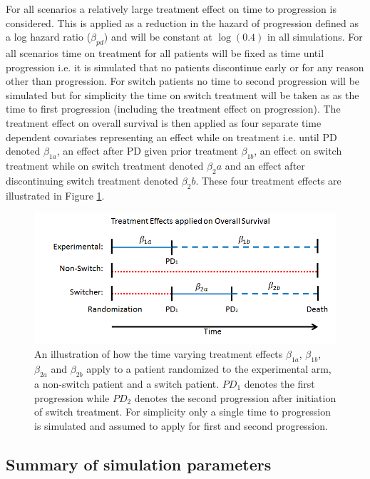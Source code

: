 For all scenarios a relatively large treatment effect on time to progression is considered. This is applied as a reduction in the hazard of progression defined as a log hazard ratio ($\beta_{pd}$) and will be constant at $\log(0.4)$ in all simulations. For all scenarios time on treatment for all patients will be fixed as time until progression i.e. it is simulated that no patients discontinue early or for any reason other than progression. For switch patients no time to second progression will be simulated but for simplicity the time on switch treatment will be taken as as the time to first progression (including the treatment effect on progression). The treatment effect on overall survival is then applied as four separate time dependent covariates representing an effect while on treatment i.e. until PD denoted $\beta_{1a}$, an effect after PD given prior treatment $\beta_{1b}$, an effect on switch treatment while on switch treatment denoted $\beta_2a$ and an effect after discontinuing switch treatment denoted $\beta_2b$. These four treatment effects are illustrated in Figure \ref{F:chap_sim_design:trtEffects}. 

\begin{figure}[h!]
\centering
\includegraphics[width=12cm]{images/chap_simdesign/simTrtEff.png}
\caption{\label{F:chap_sim_design:trtEffects} An illustration of how the time varying treatment effects $\beta_{1a}$, $\beta_{1b}$, $\beta_{2a}$ and $\beta_{2b}$ apply to a patient randomized to the experimental arm, a non-switch patient and a switch patient. $PD_{1}$ denotes the first progression while $PD_2$ denotes the second progression after initiation of switch treatment. For simplicity only a single time to progression is simulated and assumed to apply for first and second progression.}
\end{figure}

\clearpage

\subsection{Summary of simulation parameters}

